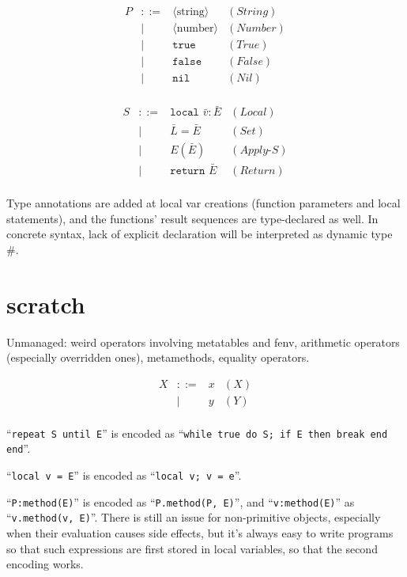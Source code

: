 \documentclass{article}
\newcommand{\Return}[1]{\texttt{return\ }#1}
\newcommand{\Local}[1]{\texttt{local\ }#1}
\newcommand{\eqlabel}[1]{(\textit{#1})}
\begin{document}
\begin{equation}
\begin{array}{rcll}
P &::=& \langle\textrm{string}\rangle & \eqlabel{String} \\
  &|&   \langle\textrm{number}\rangle & \eqlabel{Number} \\
  &|&   \texttt{true} & \eqlabel{True} \\
  &|&   \texttt{false} & \eqlabel{False} \\
  &|&   \texttt{nil} & \eqlabel{Nil} \\
\end{array}
\end{equation}

\begin{equation}
\begin{array}{rcll}
S &::=& \Local{\bar v:\bar E} & \eqlabel{Local} \\
  &|&   \bar L = \bar E & \eqlabel{Set} \\
  &|&   E(\bar E) & \eqlabel{Apply-S} \\
  &|&   \Return \bar E & \eqlabel{Return} \\
\end{array}
\end{equation}

Type annotations are added at local var creations (function parameters
and local statements), and the functions' result sequences are
type-declared as well. In concrete syntax, lack of explicit
declaration will be interpreted as dynamic type \#.


\section{scratch}

Unmanaged: weird operators involving metatables and fenv, arithmetic
operators (especially overridden ones), metamethods, equality
operators.

\begin{equation}
\begin{array}{rcll}
X &::=& x & \eqlabel{X} \\
  &|&   y & \eqlabel{Y} \\
\end{array}
\end{equation}

``{\tt repeat S until E}'' is encoded as ``{\tt while true do S; if E then
  break end end}''.

``{\tt local v = E}'' is encoded as ``{\tt local v; v = e}''.

``{\tt P:method(E)}'' is encoded as ``{\tt P.method(P, E)}'', and
``{\tt v:method(E)}'' as ``{\tt v.method(v, E)}''.  There is still an
issue for non-primitive objects, especially when their evaluation
causes side effects, but it's always easy to write programs so that
such expressions are first stored in local variables, so that the
second encoding works.
\end{document}

